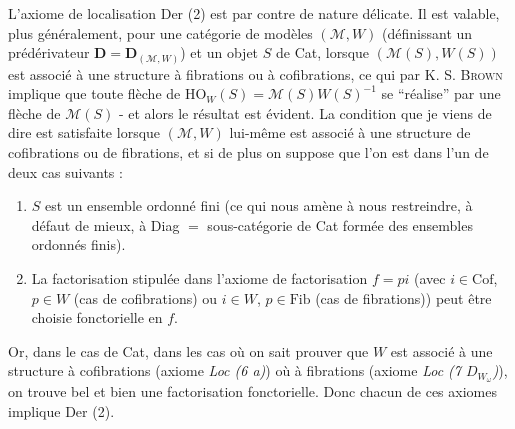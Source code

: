 L'axiome de localisation Der (2) est par contre de nature délicate. Il est valable, plus généralement, pour une catégorie de modèles $(\mathcal{M},W)$ (définissant un prédérivateur $\mathbf{D} = \mathbf{D}_{(\mathcal{M},W)}$) et un objet $S$ de Cat, lorsque $(\mathcal{M}(S),W(S))$ est associé à une structure à fibrations ou à cofibrations, ce qui par K. S. \textsc{Brown} implique que toute flèche de $\mathrm{HO}_W(S) = \mathcal{M}(S)W(S)^{-1}$ se “réalise” par une flèche de $\mathcal{M}(S)$ - et alors le résultat est évident. La condition que je viens de dire est satisfaite lorsque $(\mathcal{M},W)$ lui-même est associé à une structure de cofibrations ou de fibrations,
et si de plus on suppose que l'on est dans l'un de deux cas suivants : %
\begin{enumerate}[label=\alph*)]
\item $S$ est un ensemble ordonné fini (ce qui nous amène à nous restreindre, à défaut de mieux, à Diag $=$ sous-catégorie de Cat formée des ensembles ordonnés finis).
\item La factorisation stipulée dans l'axiome de factorisation $f = pi$ (avec $i \in \mathrm{Cof}$, $p \in W$ (cas de cofibrations) ou $i \in W$, $p \in \mathrm{Fib}$ (cas de fibrations)) peut être choisie fonctorielle en $f$.
\end{enumerate}
Or, dans le cas de Cat, dans les cas où on sait prouver que $W$ est associé à une structure à cofibrations (axiome \textit{Loc (6 a)}) où à fibrations (axiome \textit{Loc (7 $D_{W_\omega}$)}), on trouve bel et bien une factorisation fonctorielle. Donc chacun de ces axiomes implique Der (2). %

